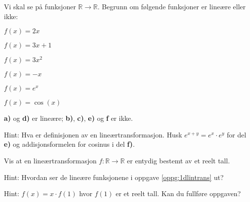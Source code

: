 
\begin{oppgave}
\label{oppg:1dlintrans}
Vi skal se på funksjoner $\mathbb{R}\rightarrow \mathbb{R}$. Begrunn om følgende funksjoner er lineære eller ikke:

\begin{punkt}
$f(x) = 2x$
\end{punkt}

\begin{punkt}
$f(x) = 3x+1$
\end{punkt}

\begin{punkt}
$f(x) = 3x^2$
\end{punkt}

\begin{punkt}
$f(x)= -x$
\end{punkt}

\begin{punkt}
$f(x)=e^x$
\end{punkt}

\begin{punkt}
$f(x)=\cos (x)$
\end{punkt}
\end{oppgave}

\begin{losning}

\textbf{a)} og \textbf{d)} er lineære; \textbf{b)}, \textbf{c)}, \textbf{e)} og \textbf{f} er ikke.

\noindent
Hint: Hva er definisjonen av en lineærtransformasjon. Husk $e^{x+y}=e^x\cdot e^y$ for del \textbf{e)} og addisjonsformelen for cosinus i del \textbf{f)}.

\end{losning}


\begin{oppgave}
Vis at en lineærtransformasjon $f:\mathbb{R}\rightarrow \mathbb{R}$ er entydig bestemt av et reelt tall.

\noindent 
Hint: Hvordan ser de lineære funksjonene i oppgave \ref{oppg:1dlintrans} ut?
\end{oppgave}


\begin{losning}
Hint: $f(x)=x\cdot f(1)$ hvor $f(1)$ er et reelt tall. Kan du fullføre oppgaven?
\end{losning}